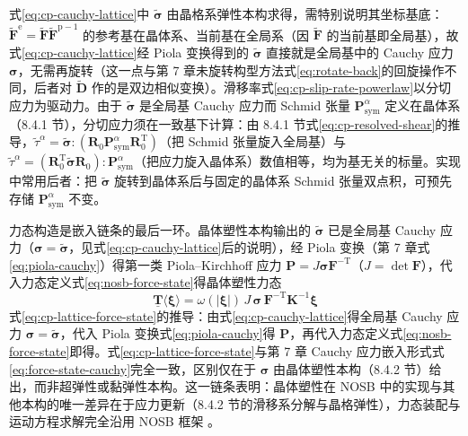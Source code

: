式\eqref{eq:cp-cauchy-lattice}中 $\tilde{\boldsymbol{\sigma}}$ 由晶格系弹性本构求得，需特别说明其坐标基底：$\tilde{\mathbf{F}}^{\mathrm{e}}=\tilde{\mathbf{F}}\tilde{\mathbf{F}}^{\mathrm{p}-1}$ 的参考基在晶体系、当前基在全局系（因 $\tilde{\mathbf{F}}$ 的当前基即全局基），故式\eqref{eq:cp-cauchy-lattice}经 Piola 变换得到的 $\tilde{\boldsymbol{\sigma}}$ 直接就是全局基中的 Cauchy 应力 $\boldsymbol{\sigma}$，无需再旋转（这一点与第 7 章未旋转构型方法式\eqref{eq:rotate-back}的回旋操作不同，后者对 $\tilde{\mathbf{D}}$ 作的是双边相似变换）。滑移率式\eqref{eq:cp-slip-rate-powerlaw}以分切应力为驱动力。由于 $\tilde{\boldsymbol{\sigma}}$ 是全局基 Cauchy 应力而 Schmid 张量 $\mathbf{P}^{\alpha}_{\mathrm{sym}}$ 定义在晶体系（8.4.1 节），分切应力须在一致基下计算：由 8.4.1 节式\eqref{eq:cp-resolved-shear}的推导，$\tilde{\tau}^{\alpha}=\tilde{\boldsymbol{\sigma}}:(\mathbf{R}_{0}\mathbf{P}^{\alpha}_{\mathrm{sym}}\mathbf{R}_{0}^{\mathrm{T}})$（把 Schmid 张量旋入全局基）与 $\tilde{\tau}^{\alpha}=(\mathbf{R}_{0}^{\mathrm{T}}\tilde{\boldsymbol{\sigma}}\mathbf{R}_{0}):\mathbf{P}^{\alpha}_{\mathrm{sym}}$（把应力旋入晶体系）数值相等，均为基无关的标量。实现中常用后者：把 $\tilde{\boldsymbol{\sigma}}$ 旋转到晶体系后与固定的晶体系 Schmid 张量双点积，可预先存储 $\mathbf{P}^{\alpha}_{\mathrm{sym}}$ 不变。

力态构造是嵌入链条的最后一环。晶体塑性本构输出的 $\tilde{\boldsymbol{\sigma}}$ 已是全局基 Cauchy 应力（$\boldsymbol{\sigma}=\tilde{\boldsymbol{\sigma}}$，见式\eqref{eq:cp-cauchy-lattice}后的说明），经 Piola 变换（第 7 章式\eqref{eq:piola-cauchy}）得第一类 Piola--Kirchhoff 应力 $\mathbf{P}=J\boldsymbol{\sigma}\mathbf{F}^{-\mathrm{T}}$（$J=\det\mathbf{F}$），代入力态定义式\eqref{eq:nosb-force-state}得晶体塑性力态
\begin{equation}
  \underline{\mathbf{T}}\langle\boldsymbol{\xi}\rangle
  =\omega(|\boldsymbol{\xi}|)\,J\,\boldsymbol{\sigma}\,\mathbf{F}^{-\mathrm{T}}\mathbf{K}^{-1}\boldsymbol{\xi}
  \label{eq:cp-lattice-force-state}
\end{equation}
式\eqref{eq:cp-lattice-force-state}的推导：由式\eqref{eq:cp-cauchy-lattice}得全局基 Cauchy 应力 $\boldsymbol{\sigma}=\tilde{\boldsymbol{\sigma}}$，代入 Piola 变换式\eqref{eq:piola-cauchy}得 $\mathbf{P}$，再代入力态定义式\eqref{eq:nosb-force-state}即得。式\eqref{eq:cp-lattice-force-state}与第 7 章 Cauchy 应力嵌入形式式\eqref{eq:force-state-cauchy}完全一致，区别仅在于 $\boldsymbol{\sigma}$ 由晶体塑性本构（8.4.2 节）给出，而非超弹性或黏弹性本构。这一链条表明：晶体塑性在 NOSB 中的实现与其他本构的唯一差异在于应力更新（8.4.2 节的滑移系分解与晶格弹性），力态装配与运动方程求解完全沿用 NOSB 框架 \cite{SunSundararaghavan2014,Littlewood2011}。

